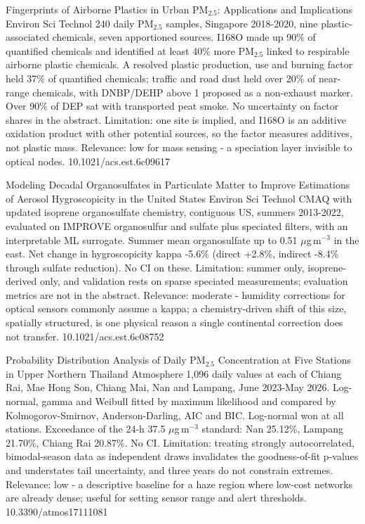 \documentclass[10pt]{article}
\begin{document}
{Fingerprints of Airborne Plastics in Urban PM$_{2.5}$: Applications and Implications}
{Environ Sci Technol}
{240 daily PM$_{2.5}$ samples, Singapore 2018-2020, nine plastic-associated chemicals, seven apportioned sources. I168O made up 90\% of quantified chemicals and identified at least 40\% more PM$_{2.5}$ linked to respirable airborne plastic chemicals. A resolved plastic production, use and burning factor held 37\% of quantified chemicals; traffic and road dust held over 20\% of near-range chemicals, with DNBP/DEHP above 1 proposed as a non-exhaust marker. Over 90\% of DEP sat with transported peat smoke. No uncertainty on factor shares in the abstract. Limitation: one site is implied, and I168O is an additive oxidation product with other potential sources, so the factor measures additives, not plastic mass. Relevance: low for mass sensing - a speciation layer invisible to optical nodes.}
{10.1021/acs.est.6c09617}

{Modeling Decadal Organosulfates in Particulate Matter to Improve Estimations of Aerosol Hygroscopicity in the United States}
{Environ Sci Technol}
{CMAQ with updated isoprene organosulfate chemistry, contiguous US, summers 2013-2022, evaluated on IMPROVE organosulfur and sulfate plus speciated filters, with an interpretable ML surrogate. Summer mean organosulfate up to 0.51 $\mu$g\,m$^{-3}$ in the east. Net change in hygroscopicity kappa -5.6\% (direct +2.8\%, indirect -8.4\% through sulfate reduction). No CI on these. Limitation: summer only, isoprene-derived only, and validation rests on sparse speciated measurements; evaluation metrics are not in the abstract. Relevance: moderate - humidity corrections for optical sensors commonly assume a kappa; a chemistry-driven shift of this size, spatially structured, is one physical reason a single continental correction does not transfer.}
{10.1021/acs.est.6c08752}

{Probability Distribution Analysis of Daily PM$_{2.5}$ Concentration at Five Stations in Upper Northern Thailand}
{Atmosphere}
{1,096 daily values at each of Chiang Rai, Mae Hong Son, Chiang Mai, Nan and Lampang, June 2023-May 2026. Log-normal, gamma and Weibull fitted by maximum likelihood and compared by Kolmogorov-Smirnov, Anderson-Darling, AIC and BIC. Log-normal won at all stations. Exceedance of the 24-h 37.5 $\mu$g\,m$^{-3}$ standard: Nan 25.12\%, Lampang 21.70\%, Chiang Rai 20.87\%. No CI. Limitation: treating strongly autocorrelated, bimodal-season data as independent draws invalidates the goodness-of-fit p-values and understates tail uncertainty, and three years do not constrain extremes. Relevance: low - a descriptive baseline for a haze region where low-cost networks are already dense; useful for setting sensor range and alert thresholds.}
{10.3390/atmos17111081}
\end{document}
